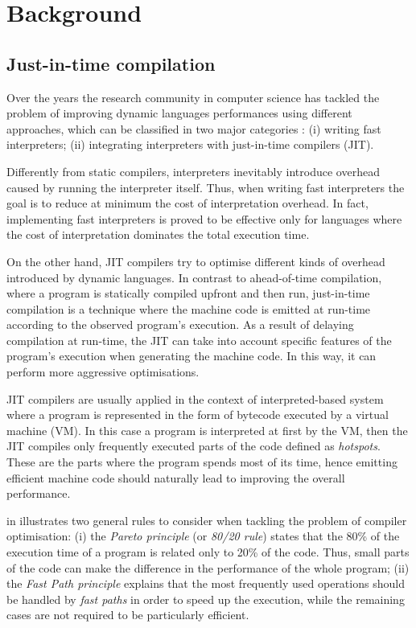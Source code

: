\chapter{Background}
\label{chapter:background}

\section{Just-in-time compilation}
Over the years the research community in computer science has tackled the problem of improving dynamic languages performances using different approaches, which can be classified in two major categories \cite{arnold2005survey, cuni2010high}: (i) writing fast interpreters; (ii) integrating interpreters with just-in-time compilers (JIT).

Differently from static compilers, interpreters inevitably introduce overhead caused by running the interpreter itself. Thus, when writing fast interpreters the goal is to reduce at minimum the cost of interpretation overhead. In fact, implementing fast interpreters is proved to be effective only for languages where the cost of interpretation dominates the total execution time. 

On the other hand, JIT compilers try to optimise different kinds of overhead introduced by dynamic languages. In contrast to ahead-of-time compilation, where a program is statically compiled upfront and then run, just-in-time compilation is a technique where the machine code is emitted at run-time according to the observed program's execution. As a result of delaying compilation at run-time, the JIT can take into account specific features of the program's execution when generating the machine code. In this way, it can perform more aggressive optimisations. 

JIT compilers are usually applied in the context of interpreted-based system where a program is represented in the form of bytecode executed by a virtual machine (VM). In this case a program is interpreted at first by the VM, then the JIT compiles only frequently executed parts of the code defined as \textit{hotspots}. These are the parts where the program spends most of its time, hence emitting efficient machine code should naturally lead to improving the overall performance.

\citeauthor{cuni2010high} in \cite{cuni2010high} illustrates two general rules to consider when tackling the problem of compiler optimisation: (i) the \textit{Pareto principle} (or \textit{80/20 rule}) \cite{wiki:pareto} states that the 80\% of the execution time of a program is related only to 20\% of the code. Thus, small parts of the code can make the difference in the performance of the whole program; (ii) the \textit{Fast Path principle} \cite{hoschka1993control} explains that the most frequently used operations should be handled by \textit{fast paths} in order to speed up the execution, while the remaining cases are not required to be particularly efficient. 

